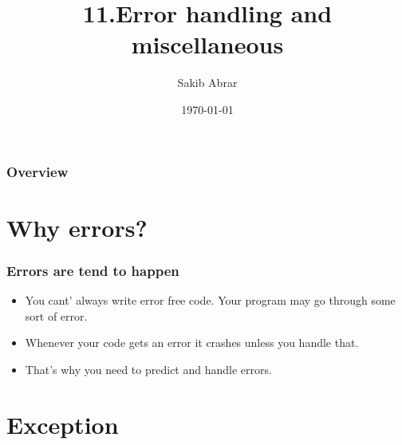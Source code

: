 \documentclass{beamer}
\title[Errors]{11.Error handling and miscellaneous} %
\author{Sakib Abrar} %
\institute[BUET] %
{
CSE\\~\\Bangladesh University of Engineering \& Technology \\ %
\medskip
\textit{sakib.cghs@gmail.com} %
}
\date{\today} %
\begin{document}
\begin{frame}
\titlepage %
\end{frame}

\begin{frame}
\frametitle{Overview} %
\tableofcontents %
\end{frame}


\section{Why errors?}

\begin{frame}
\frametitle{Errors are tend to happen}
\begin{itemize}
\item You cant' always write error free code. Your program may go through some sort of error.
\item Whenever your code gets an error it crashes unless you handle that.
\item That's why you need to predict and handle errors.
\end{itemize}
\end{frame}



\section{Exception}
\end{document}
